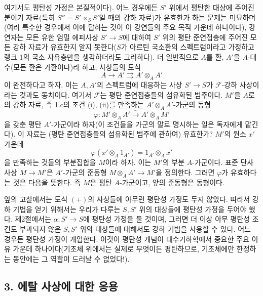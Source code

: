 여기서도 평탄성 가정은 본질적이다). 어느 경우에든 $S'$ 위에서 평탄한
대상에 주어진 붙이기 자료(특히 $S''=S'\times_SS'$일 때의 강하 자료)가
유효한가 하는 문제는 미묘하며(여러 특수한 경우에서 이에 답하는 것이 이
강연들의 주요 목적 가운데 하나이다), 강연자는 모든 유한 엄밀 에피사상
$S'\longrightarrow S$에 대하여 $S'$ 위의 평탄 준연접층에 주어진 모든 강하
자료가 유효한지 알지 못한다($S$가 아르틴 국소환의 스펙트럼이라고 가정하고
랭크 1의 국소 자유층만을 생각하더라도 그러하다). 더 일반적으로 $A$를 환,
$A'$을 $A$-대수(모든 환은 가환이다)라 하고, 사상들의 도식
\[
  A\longrightarrow A'\rightrightarrows A'\otimes_AA'
\]
이 완전하다고 하자. 이는 $A,A'$의 스펙트럼에 대응하는 사상
$S'\longrightarrow S$가 $\mathcal F$-강하 사상이라는 것과도 동치이다.
여기서 $\mathcal F$는 평탄 준연접층들의 섬유화된 범주이다. $M'$을 $A$로의
강하 자료, 즉 1.c의 조건 (i), (ii)를 만족하는 $A'\otimes_AA'$-가군의 동형
\[
  \varphi:M'\otimes_AA'\xrightarrow{\sim}A'\otimes_AM'
\]
을 갖춘 평탄 $A'$-가군이라 하자(이 조건들을 가군의 말로 명시하는 일은
독자에게 맡긴다). 이 자료는 (평탄 준연접층들의 섬유화된 범주에 관하여)
유효한가? $M'$의 원소 $x'$ 가운데
\[
  \varphi(x'\otimes_A1_{A'})=1_{A'}\otimes_Ax'
\]
을 만족하는 것들의 부분집합을 $M$이라 하자. 이는 $M'$의 부분
$A$-가군이다. 표준 단사사상 $M\longrightarrow M'$은 $A'$-가군의 준동형
$M\otimes_AA'\longrightarrow M'$을 정의한다. 그러면 $\varphi$가
유효하다는 것은 다음을 뜻한다. 즉 $M$은 평탄 $A$-가군이고, 앞의
준동형은 동형이다.

 앞의 고찰에서는 도식 $(+)$의 사상들에 아무런 평탄성
가정도 두지 않았다. 따라서 강하 기법을 얻기 위해서는 우리가 다루는
$S,S'$ 위의 대상들에 평탄성 가정을 두어야 했다. 제2절에서는
$\alpha:S'\longrightarrow S$에 평탄성 가정을 둘 것이며, 그러면 더 이상
아무 평탄성 조건도 부과되지 않은 $S,S'$ 위의 대상들에 대해서도 강하
기법을 사용할 수 있다. 어느 경우든 평탄성 가정이 개입한다. 이것이
평탄성 개념이 대수기하학에서 중요한 주요 이유 가운데 하나이다(기초체
위에서는 실제로 무엇이든 평탄하므로, 기초체에만 한정하는 동안에는 그
역할이 드러날 수 없었다!).

\subsection*{3. 에탈 사상에 대한 응용}

